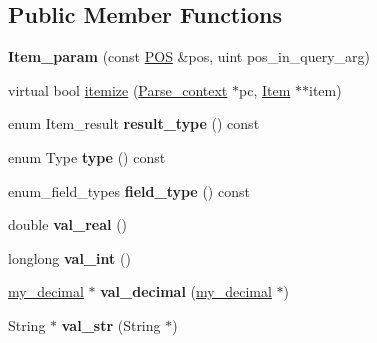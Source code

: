 \subsection*{Public Member Functions}
\begin{DoxyCompactItemize}
\item 
\mbox{\label{classItem__param_abfeaa299e834044cb0d7fff8f82bed53}} 
{\bfseries Item\+\_\+param} (const \mbox{\hyperlink{structYYLTYPE}{P\+OS}} \&pos, uint pos\+\_\+in\+\_\+query\+\_\+arg)
\item 
virtual bool \mbox{\hyperlink{classItem__param_a60919152e0bdfb240b4a2d875178a303}{itemize}} (\mbox{\hyperlink{structParse__context}{Parse\+\_\+context}} $\ast$pc, \mbox{\hyperlink{classItem}{Item}} $\ast$$\ast$item)
\item 
\mbox{\label{classItem__param_a7cb7c523aebd33a4a793d62d78f2b460}} 
enum Item\+\_\+result {\bfseries result\+\_\+type} () const
\item 
\mbox{\label{classItem__param_aa1268707629cfd1668c7809852353647}} 
enum Type {\bfseries type} () const
\item 
\mbox{\label{classItem__param_af933eb500296afde8d5ce39ca662301b}} 
enum\+\_\+field\+\_\+types {\bfseries field\+\_\+type} () const
\item 
\mbox{\label{classItem__param_a38daaa1f3680264e24113bd9575a5845}} 
double {\bfseries val\+\_\+real} ()
\item 
\mbox{\label{classItem__param_a7862c1bd32ed270e484ba7f176419763}} 
longlong {\bfseries val\+\_\+int} ()
\item 
\mbox{\label{classItem__param_aabc15b4ba09e772ca796d38603cab084}} 
\mbox{\hyperlink{classmy__decimal}{my\+\_\+decimal}} $\ast$ {\bfseries val\+\_\+decimal} (\mbox{\hyperlink{classmy__decimal}{my\+\_\+decimal}} $\ast$)
\item 
\mbox{\label{classItem__param_a2c17fffad66ed5720b5f726137fe2ae1}} 
String $\ast$ {\bfseries val\+\_\+str} (String $\ast$)
\item 
\mbox{\label{classItem__param_a9219e0f04cff0006af52d988920ac9c7}} 
$$
\end{DoxyCompactItemize}
